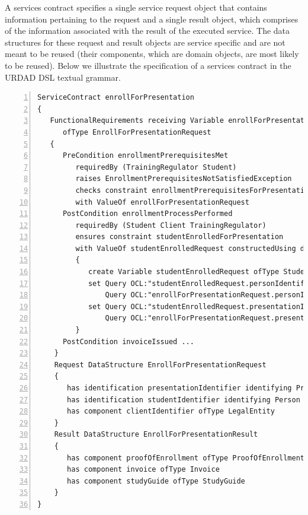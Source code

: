 A services contract specifies a single service request object that contains information pertaining to the request and a single result object, which comprises of the information associated with the result of the executed service. The data structures for these request and result objects are service specific and are not meant to be reused (their components, which are domain objects, are most likely to be reused). Below we illustrate the specification of a services contract in the URDAD DSL textual grammar.
\tiny \begin{lstlisting}[numbers=left,escapechar=|]
ServiceContract enrollForPresentation
{
   FunctionalRequirements receiving Variable enrollForPresentationRequest 
      ofType EnrollForPresentationRequest
   {
      PreCondition enrollmentPrerequisitesMet
         requiredBy (TrainingRegulator Student) 
         raises EnrollmentPrerequisitesNotSatisfiedException
         checks constraint enrollmentPrerequisitesForPresentationMet
         with ValueOf enrollForPresentationRequest
      PostCondition enrollmentProcessPerformed
         requiredBy (Student Client TrainingRegulator)
         ensures constraint studentEnrolledForPresentation 
         with ValueOf studentEnrolledRequest constructedUsing doSequential
         {
            create Variable studentEnrolledRequest ofType StudentEnrolledRequest
            set Query OCL:"studentEnrolledRequest.personIdentifier" equalTo
                Query OCL:"enrollForPresentationRequest.personIdentifier"                            
            set Query OCL:"studentEnrolledRequest.presentationIdentifier" equalTo
                Query OCL:"enrollForPresentationRequest.presentationIdentifier"                            
         }  
      PostCondition invoiceIssued ...
    }            
    Request DataStructure EnrollForPresentationRequest 
    {
       has identification presentationIdentifier identifying Presentation
       has identification studentIdentifier identifying Person
       has component clientIdentifier ofType LegalEntity         
    }
    Result DataStructure EnrollForPresentationResult 
    {
       has component proofOfEnrollment ofType ProofOfEnrollment
       has component invoice ofType Invoice
       has component studyGuide ofType StudyGuide
    }
}
\end{lstlisting}\normalsize


